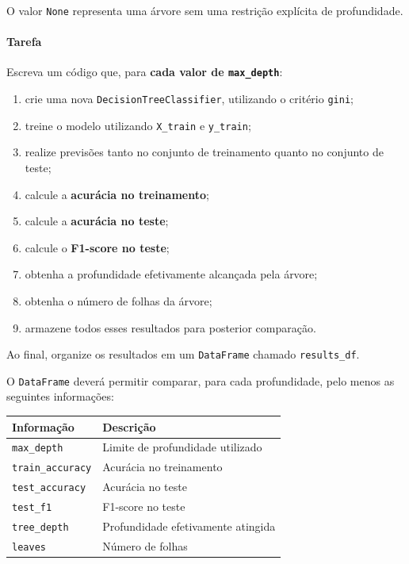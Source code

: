 \documentclass[11pt]{article}
\providecommand{\tightlist}{%
      \setlength{\itemsep}{0pt}\setlength{\parskip}{0pt}}
\newcounter{none}
\begin{document}
O valor \texttt{None} representa uma árvore sem uma restrição explícita
de profundidade.

\paragraph{Tarefa}\label{tarefa}

Escreva um código que, para \textbf{cada valor de \texttt{max\_depth}}:

\begin{enumerate}
\def\labelenumi{\arabic{enumi}.}
\tightlist
\item
  crie uma nova \texttt{DecisionTreeClassifier}, utilizando o critério
  \texttt{gini};
\item
  treine o modelo utilizando \texttt{X\_train} e \texttt{y\_train};
\item
  realize previsões tanto no conjunto de treinamento quanto no conjunto
  de teste;
\item
  calcule a \textbf{acurácia no treinamento};
\item
  calcule a \textbf{acurácia no teste};
\item
  calcule o \textbf{F1-score no teste};
\item
  obtenha a profundidade efetivamente alcançada pela árvore;
\item
  obtenha o número de folhas da árvore;
\item
  armazene todos esses resultados para posterior comparação.
\end{enumerate}

Ao final, organize os resultados em um \texttt{DataFrame} chamado
\texttt{results\_df}.

O \texttt{DataFrame} deverá permitir comparar, para cada profundidade,
pelo menos as seguintes informações:

{\def\LTcaptype{none} %
\begin{longtable}[]{@{}ll@{}}
\toprule\noalign{}
Informação & Descrição \\
\midrule\noalign{}
\endhead
\bottomrule\noalign{}
\endlastfoot
\texttt{max\_depth} & Limite de profundidade utilizado \\
\texttt{train\_accuracy} & Acurácia no treinamento \\
\texttt{test\_accuracy} & Acurácia no teste \\
\texttt{test\_f1} & F1-score no teste \\
\texttt{tree\_depth} & Profundidade efetivamente atingida \\
\texttt{leaves} & Número de folhas \\
\end{longtable}
}
\end{document}
